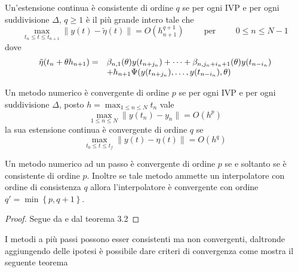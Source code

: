 \begin{defn}
Un'estensione continua è consistente di ordine $q$ se per ogni IVP e per ogni suddivisione $\Delta$, 
$q \geq 1$ è il più grande intero tale che 
 $$
\max_{t_n \le t \le t_{n+1}}
 \| y(t) - \tilde{\eta}(t)  \| = O(h_{n+1}^{q+1})
\hspace{1cm}	
\mbox{per}
\hspace{1cm}
0 \le n \le N-1
 $$
 dove
$$
\begin{array}{c lc}
\tilde{\eta}(t_n+\theta h_{n+1}) =	& \beta_{n,1} (\theta) y(t_{n+j_n}) + \dots + 
					    \beta_{n,j_n + i_n + 1} (\theta) y(t_{n-i_n})\\
					& + h_{n+1} \Psi (y(t_{n+j_n}), \dots , y(t_{n-i_n}), \theta)	
\end{array}
$$
\end{defn}

\begin{defn}[Convergenza]
 Un metodo numerico è convergente di ordine $p$ se per ogni IVP e per ogni suddivisione $\Delta$, 
 posto $\displaystyle h = \max_{1 \le n \le N} t_n$ vale
$$
\max_{1 \le n \le N} \| y(t_n) -  y_n \| = O(h^p)
$$
la sua estensione continua è convergente di ordine $q$ se 
$$
\max_{t_0 \le t \le t_f} \| y(t) - \eta (t) \| = O(h^q)
$$
\end{defn}

\begin{thm}
 Un metodo numerico ad un passo è convergente di ordine $p$ se e soltanto se è consistente di ordine $p$.
 Inoltre se tale metodo ammette un interpolatore  con ordine di 
consistenza $q$ allora l'interpolatore è convergente con ordine $q'=\min \left \{ p,q+1 \right \}$.
\end{thm}
\begin{proof}
 Segue da \cite[par 4.3]{3} e dal teorema  3.2
\end{proof}

\vspace{0.5cm}
I metodi a più passi possono esser consistenti ma non convergenti, daltronde aggiungendo 
delle ipotesi è possibile dare criteri di convergenza come mostra il seguente teorema

